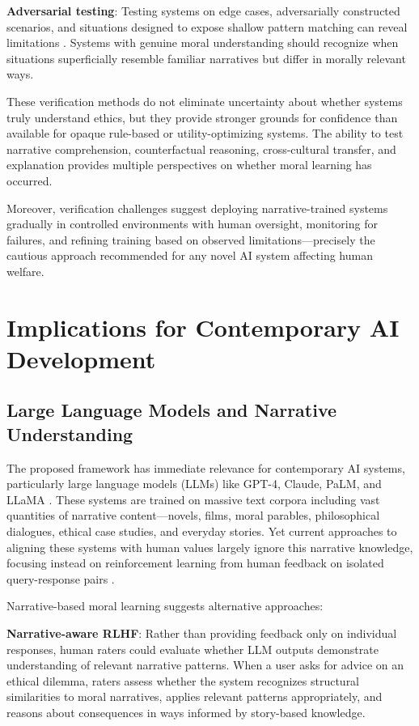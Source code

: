 \documentclass[12pt]{article}
\begin{document}
\textbf{Adversarial testing}: Testing systems on edge cases, adversarially constructed scenarios, and situations designed to expose shallow pattern matching can reveal limitations \citep{kenton2021alignment}. Systems with genuine moral understanding should recognize when situations superficially resemble familiar narratives but differ in morally relevant ways.

These verification methods do not eliminate uncertainty about whether systems truly understand ethics, but they provide stronger grounds for confidence than available for opaque rule-based or utility-optimizing systems. The ability to test narrative comprehension, counterfactual reasoning, cross-cultural transfer, and explanation provides multiple perspectives on whether moral learning has occurred.

Moreover, verification challenges suggest deploying narrative-trained systems gradually in controlled environments with human oversight, monitoring for failures, and refining training based on observed limitations---precisely the cautious approach recommended for any novel AI system affecting human welfare.

\section{Implications for Contemporary AI Development}

\subsection{Large Language Models and Narrative Understanding}

The proposed framework has immediate relevance for contemporary AI systems, particularly large language models (LLMs) like GPT-4, Claude, PaLM, and LLaMA \citep{brown2020language, openai2023gpt4}. These systems are trained on massive text corpora including vast quantities of narrative content---novels, films, moral parables, philosophical dialogues, ethical case studies, and everyday stories. Yet current approaches to aligning these systems with human values largely ignore this narrative knowledge, focusing instead on reinforcement learning from human feedback on isolated query-response pairs \citep{ouyang2022training}.

Narrative-based moral learning suggests alternative approaches:

\textbf{Narrative-aware RLHF}: Rather than providing feedback only on individual responses, human raters could evaluate whether LLM outputs demonstrate understanding of relevant narrative patterns. When a user asks for advice on an ethical dilemma, raters assess whether the system recognizes structural similarities to moral narratives, applies relevant patterns appropriately, and reasons about consequences in ways informed by story-based knowledge.
\end{document}
